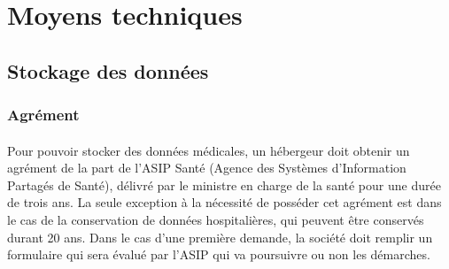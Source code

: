     \section{Moyens techniques}

        \subsection{Stockage des données}
        \subsubsection{Agrément}

\paragraph{}
Pour pouvoir stocker des données médicales, un hébergeur doit obtenir un
agrément de la part de l'ASIP Santé (Agence des Systèmes d'Information Partagés
de Santé), délivré par le ministre en charge de la santé pour une durée de
trois ans. La seule exception à la nécessité de posséder cet agrément est dans
le cas de la conservation de données hospitalières, qui peuvent être conservés
durant 20 ans. Dans le cas d'une première demande, la société doit remplir un
formulaire qui sera évalué par l'ASIP qui va poursuivre ou non les démarches.

